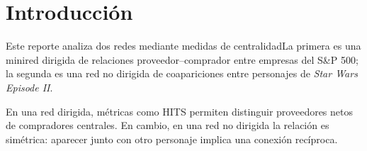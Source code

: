 \section{Introducción}

Este reporte analiza dos redes mediante medidas de centralidadLa primera es una minired dirigida de relaciones proveedor--comprador entre empresas del S\&P 500; la segunda es una red no dirigida de coapariciones entre personajes de \textit{Star Wars Episode II}.

En una red dirigida, métricas como HITS permiten distinguir proveedores netos de compradores centrales. En cambio, en una red no dirigida la relación es simétrica: aparecer junto con otro personaje implica una conexión recíproca. 